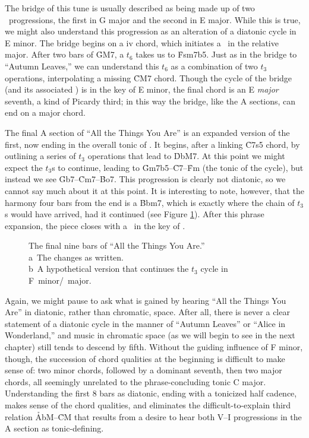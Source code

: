 The bridge of this tune is usually described as being made up of two \tfo\
progressions, the first in G major and the second in E major. While this is
true, we might also understand this progression as an alteration of a diatonic
cycle in E minor.  The bridge begins on a iv chord, which initiates a \tfo\ in
the relative major. After two bars of \h{GM7}, a $t_6$ takes us to \h{Fsm7b5}.
Just as in the bridge to “Autumn Leaves,” we can understand this $t_6$ as a
combination of two $t_3$ operations, interpolating a missing \h{CM7}
chord.\fn{ds-19} Though the cycle of the bridge (and its associated \gis{}) is in
the key of E minor, the final chord is an E \emph{major} seventh, a kind of
Picardy third; in this way the bridge, like the A sections, can end on a major
chord.

The final A section of “All the Things You Are” is an expanded version of the
first, now ending in the overall tonic of \Aflat. It begins, after a linking
\h{C7s5} chord, by outlining a series of $t_3$ operations that lead to
\h{DbM7}.\fn{ds-20} At this point we might expect the $t_3$s to continue,
leading to \h{Gm7b5}--\h{C7}--\h{Fm} (the tonic of the cycle), but instead we
see \h{Gb7}--\h{Cm7}--\h{Bo7}. This progression is clearly not diatonic, so we
cannot say much about it at this point. It is interesting to note, however,
that the harmony four bars from the end is a \h{Bbm7}, which is exactly where the
chain of $t_3$s would have arrived, had it continued (see Figure
\ref{ds:all-things-last-a}). After this phrase expansion, the piece closes
with a \tfo\ in the key of \Aflat.

\begin{figure}[htbp]
  \captionsetup{format=hang}
  \caption[Two versions of “All the Things You Are,” final nine bars.]{The
  final nine bars of “All the Things You Are.” \\
  a\rightparen\ The changes as written. \\
  b\rightparen\ A hypothetical version that continues the $t_3$ cycle in \mbox{F
    minor/}\Aflat\ major.}
  \label{ds:all-things-last-a}
\end{figure}

Again, we might pause to ask what is gained by hearing “All the Things You
Are” in diatonic, rather than chromatic, space. After all, there is never a
clear statement of a diatonic cycle in the manner of “Autumn Leaves” or “Alice
in Wonderland,” and music in chromatic space (as we will begin to see in the
next chapter) still tends to descend by fifth. Without the guiding influence
of F minor, though, the succession of chord qualities at the beginning is
difficult to make sense of: two minor chords, followed by a dominant seventh,
then two major chords, all seemingly unrelated to the phrase-concluding tonic
C major.\fn{ds-21} Understanding the first 8 bars as diatonic, ending with a
tonicized half cadence, makes sense of the chord qualities, and eliminates the
difficult-\hspace{0pt}to-explain third relation \h{AbM}--\h{CM} that results
from a desire to hear both \mbox{V--I} progressions in the A section as
tonic-defining.\fn{ds-22}

